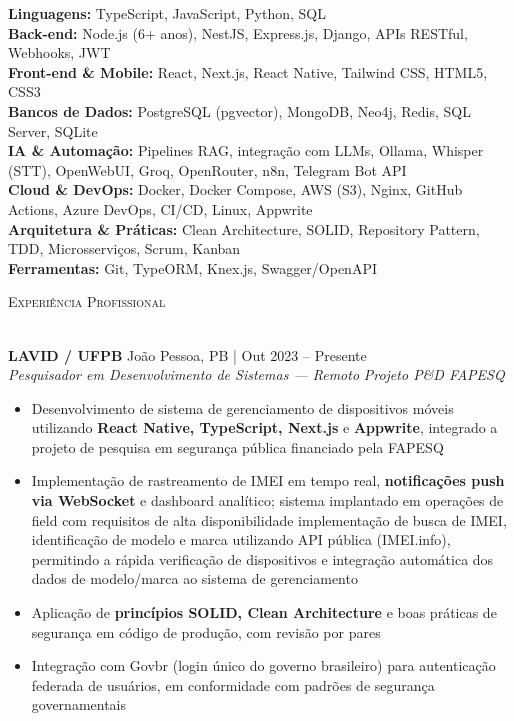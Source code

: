 \documentclass[a4paper]{article}
\newcommand{\lineunder}{
    \vspace*{-8pt} \\
    \hspace*{-18pt} \hrulefill \\
}
\newcommand{\header}[1]{
    {\hspace*{-18pt}\vspace*{6pt} \textsc{#1}}
    \vspace*{-6pt} \lineunder
}
\begin{document}
\textbf{Linguagens:} TypeScript, JavaScript, Python, SQL\\
\vspace{1mm}
\textbf{Back-end:} Node.js (6+ anos), NestJS, Express.js, Django, APIs RESTful, Webhooks, JWT\\
\vspace{1mm}
\textbf{Front-end \& Mobile:} React, Next.js, React Native, Tailwind CSS, HTML5, CSS3\\
\vspace{1mm}
\textbf{Bancos de Dados:} PostgreSQL (pgvector), MongoDB, Neo4j, Redis, SQL Server, SQLite\\
\vspace{1mm}
\textbf{IA \& Automação:} Pipelines RAG, integração com LLMs, Ollama, Whisper (STT), OpenWebUI, Groq, OpenRouter, n8n, Telegram Bot API\\
\vspace{1mm}
\textbf{Cloud \& DevOps:} Docker, Docker Compose, AWS (S3), Nginx, GitHub Actions, Azure DevOps, CI/CD, Linux, Appwrite\\
\vspace{1mm}
\textbf{Arquitetura \& Práticas:} Clean Architecture, SOLID, Repository Pattern, TDD, Microsserviços, Scrum, Kanban\\
\vspace{1mm}
\textbf{Ferramentas:} Git, TypeORM, Knex.js, Swagger/OpenAPI\\

\vspace{3mm}

\header{Experiência Profissional}
\vspace{2mm}

\textbf{LAVID / UFPB} \hfill João Pessoa, PB | Out 2023 -- Presente\\
\textit{Pesquisador em Desenvolvimento de Sistemas — Remoto} \hfill \textit{Projeto P\&D FAPESQ}\\
\vspace{-3mm}
\begin{itemize}[leftmargin=*, itemsep=-3pt]
    \item Desenvolvimento de sistema de gerenciamento de dispositivos móveis utilizando \textbf{React Native, TypeScript, Next.js} 
    e \textbf{Appwrite}, integrado a projeto de pesquisa em segurança pública financiado pela FAPESQ
    \item Implementação de rastreamento de IMEI em tempo real, \textbf{notificações push via WebSocket}
     e dashboard analítico; sistema implantado em operações de field com requisitos de alta disponibilidade
     implementação de busca de IMEI, identificação de modelo e marca utilizando API pública (IMEI.info), 
     permitindo a rápida verificação de dispositivos e integração automática dos dados de modelo/marca ao sistema de gerenciamento
    \item Aplicação de \textbf{princípios SOLID, Clean Architecture} e boas práticas de segurança em código de produção, com revisão por pares
    \item Integração com Govbr (login único do governo brasileiro) para autenticação federada de usuários, em conformidade com padrões de segurança governamentais
\end{itemize}
\end{document}
